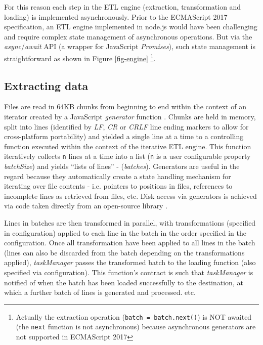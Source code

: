 For this reason each step in the ETL engine (extraction, transformation and loading) is implemented asynchronously. Prior to the ECMAScript 2017 specification, an ETL engine implemented in node.js would have been challenging and require complex state management of asynchronous operations. But via the \textit{async}/\textit{await} API (a wrapper for JavaScript \textit{Promises}), such state management is straightforward as shown in Figure \ref{fig-engine} \footnote{Actually the extraction operation (\texttt{batch = batch.next()}) is NOT awaited (the \texttt{next} function is not asynchronous) because asynchronous generators are not supported in ECMAScript 2017}.



\subsection{Extracting data}
Files are read in 64KB chunks from beginning to end within the context of an iterator created by a JavaScript \textit{generator} function \cite{mozillaGenerators}. Chunks are held in memory, split into lines (identified by \textit{LF}, \textit{CR} or \textit{CRLF} line ending markers to allow for cross-platform portability) and yielded a single line at a time to a controlling function executed within the context of the iterative ETL engine. This function iteratively collects \texttt{n} lines at a time into a list (\texttt{n} is a user configurable property \textit{batchSize}) and yields ``lists of lines'' - (\textit{batches}). Generators are useful in the regard because they automatically create a state handling mechanism for iterating over file contents - i.e. pointers to positions in files, references to incomplete lines as retrieved from files, etc. Disk access via generators is achieved via code taken directly from an open-source library \cite{bower16}.

Lines in batches are then transformed in parallel, with transformations (specified in configuration) applied to each line in the batch in the order specified in the configuration. Once all transformation have been applied to all lines in the batch (lines can also be discarded from the batch depending on the transformations applied), \textit{taskManager} passes the transformed batch to the loading function (also specified via configuration). This function's contract is such that \textit{taskManager} is notified of when the batch has been loaded successfully to the destination, at which a further batch of lines is generated and processed. etc.

